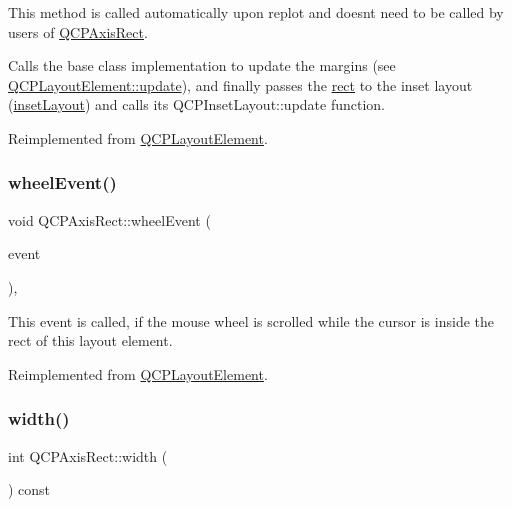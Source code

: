 This method is called automatically upon replot and doesn\textquotesingle{}t need to be called by users of \mbox{\hyperlink{class_q_c_p_axis_rect}{Q\+C\+P\+Axis\+Rect}}.

Calls the base class implementation to update the margins (see \mbox{\hyperlink{class_q_c_p_layout_element_a929c2ec62e0e0e1d8418eaa802e2af9b}{Q\+C\+P\+Layout\+Element\+::update}}), and finally passes the \mbox{\hyperlink{class_q_c_p_layout_element_a208effccfe2cca4a0eaf9393e60f2dd4}{rect}} to the inset layout (\mbox{\hyperlink{class_q_c_p_axis_rect_a949f803466619924c7018df4b511ae10}{inset\+Layout}}) and calls its Q\+C\+P\+Inset\+Layout\+::update function. 

Reimplemented from \mbox{\hyperlink{class_q_c_p_layout_element_a929c2ec62e0e0e1d8418eaa802e2af9b}{Q\+C\+P\+Layout\+Element}}.

\mbox{\label{class_q_c_p_axis_rect_a5acf41fc30aa68ea263246ecfad85c31}} 
\subsubsection{\texorpdfstring{wheel\+Event()}{wheelEvent()}}
{\footnotesize\ttfamily void Q\+C\+P\+Axis\+Rect\+::wheel\+Event (\begin{DoxyParamCaption}\item[{Q\+Wheel\+Event $\ast$}]{event }\end{DoxyParamCaption})\hspace{0.3cm}{\ttfamily [protected]}, {\ttfamily [virtual]}}

This event is called, if the mouse wheel is scrolled while the cursor is inside the rect of this layout element. 

Reimplemented from \mbox{\hyperlink{class_q_c_p_layout_element_a300521d2fd18a893c1b85f6be11ce2bf}{Q\+C\+P\+Layout\+Element}}.

\mbox{\label{class_q_c_p_axis_rect_a204645398a4f9d0b0189385c7c2cfb91}} 
\subsubsection{\texorpdfstring{width()}{width()}}
{\footnotesize\ttfamily int Q\+C\+P\+Axis\+Rect\+::width (\begin{DoxyParamCaption}{ }\end{DoxyParamCaption}) const\hspace{0.3cm}{\ttfamily [inline]}}

